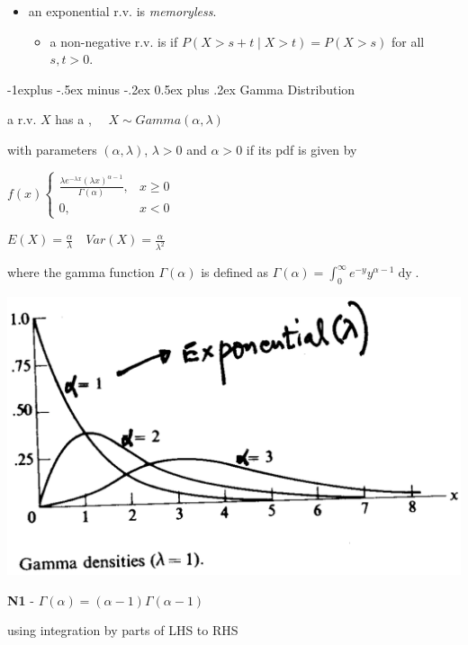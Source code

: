 \documentclass[10pt, landscape]{article}
\makeatletter
\renewcommand{\subsection}{\@startsection{subsection}{2}{0mm}%
  {-1explus -.5ex minus -.2ex}%
  {0.5ex plus .2ex}%
{\normalfont\normalsize\bfseries}}
\makeatother
\begin{document}
\begin{multicols*}{3}
  \begin{itemize}
    \item an exponential r.v. is \textit{memoryless}.
      \begin{itemize}
        \item a non-negative r.v. is  if $P(X > s + t \mid X > t) = P(X > s)$ for all  $s, t > 0$.
      \end{itemize}
  \end{itemize}

  \subsection{Gamma Distribution}

  a r.v. $X$ has a , $\quad X \sim Gamma(\alpha, \lambda)$ 

  with parameters $(\alpha, \lambda)$, $\lambda > 0$ and $\alpha > 0$ if its pdf is given by 

  \begin{tightcenter}
    $f(x) \begin{cases} \frac{\lambda e^{-\lambda x}(\lambda x)^{\alpha - 1}}{\Gamma(\alpha)} , &x \geq 0 \\ 0, &x < 0 \end{cases} $

    $E(X) = \frac{\alpha}{\lambda} \quad Var(X) = \frac{\alpha}{\lambda^2}$
  \end{tightcenter}

  where the gamma function $\Gamma(\alpha)$ is defined as 
  $\Gamma (\alpha) = \int^\infty_0 e^{-y} y^{\alpha - 1} \mathop{dy} $.

  \begin{minipage}[c]{0.4\linewidth}
    \begin{tightcenter}
      \includegraphics[width=0.9\linewidth]{st2131-gamma-distribution.png} 
    \end{tightcenter}
  \end{minipage}
  \begin{minipage}[c]{0.55\linewidth}
    \textbf{N1} - $\Gamma(\alpha) = (\alpha - 1) \Gamma(\alpha-1) $
    \begin{niceproof}
      using integration by parts of LHS to RHS
    \end{niceproof}


\end{minipage}
\end{multicols*}
\end{document}
